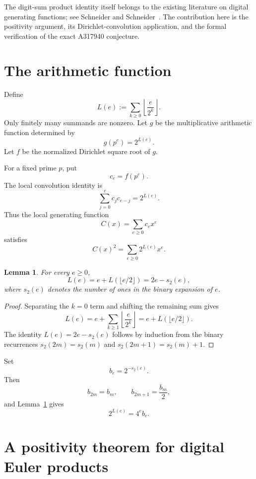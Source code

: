 \documentclass[11pt]{article}
\newtheorem{lemma}[theorem]{Lemma}
\theoremstyle{definition}
\theoremstyle{remark}
\begin{document}
The digit-sum product identity itself belongs to the existing literature on digital generating functions; see Schneider and Schneider~\cite{SchneiderSchneider}.  The contribution here is the positivity argument, its Dirichlet-convolution application, and the formal verification of the exact A317940 conjecture.

\section{The arithmetic function}

Define
\[
  L(e):=\sum_{k\ge0}\left\lfloor\frac{e}{2^k}\right\rfloor.
\]
Only finitely many summands are nonzero.  Let $g$ be the multiplicative arithmetic function determined by
\[
  g(p^e)=2^{L(e)}.
\]
Let $f$ be the normalized Dirichlet square root of $g$.

For a fixed prime $p$, put
\[
  c_e=f(p^e).
\]
The local convolution identity is
\begin{equation}\label{eq:local-convolution}
  \sum_{j=0}^{e}c_jc_{e-j}=2^{L(e)}.
\end{equation}
Thus the local generating function
\[
  C(x)=\sum_{e\ge0}c_ex^e
\]
satisfies
\[
  C(x)^2=\sum_{e\ge0}2^{L(e)}x^e.
\]

\begin{lemma}\label{lem:L-recurrence}
For every $e\ge0$,
\[
  L(e)=e+L(\lfloor e/2\rfloor)=2e-s_2(e),
\]
where $s_2(e)$ denotes the number of ones in the binary expansion of $e$.
\end{lemma}

\begin{proof}
Separating the $k=0$ term and shifting the remaining sum gives
\[
  L(e)=e+\sum_{k\ge1}\left\lfloor\frac{e}{2^k}\right\rfloor
      =e+L(\lfloor e/2\rfloor).
\]
The identity $L(e)=2e-s_2(e)$ follows by induction from the binary recurrences
$s_2(2m)=s_2(m)$ and $s_2(2m+1)=s_2(m)+1$.
\end{proof}

Set
\[
  b_e=2^{-s_2(e)}.
\]
Then
\begin{equation}\label{eq:binary-rec}
  b_{2m}=b_m,
  \qquad
  b_{2m+1}=\frac{b_m}{2},
\end{equation}
and Lemma~\ref{lem:L-recurrence} gives
\[
  2^{L(e)}=4^e b_e.
\]

\section{A positivity theorem for digital Euler products}
\end{document}
